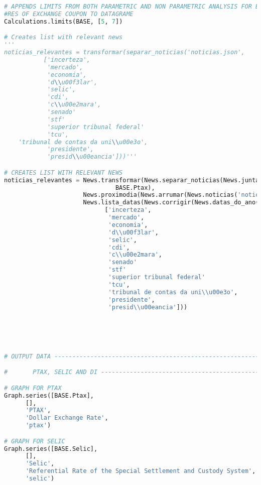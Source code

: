 \begin{lstlisting}[language=Python]
# APPENDS LIMITS FROM BOTH PARAMETRIC AND NON PARAMETRIC ANALYSIS FOR BOTH MEASU
#RES OF EXCHANGE COUPON TO DATAGRAME
Calculations.limits(BASE, [5, 7])

# Creates list with relevant news
'''
noticias_relevantes = transformar(separar_noticias('noticias.json',
           ['incerteza',
            'mercado',
            'economia',
            'd\\u00f3lar',
            'selic',
            'cdi',
            'c\\u00e2mara',
            'senado'
            'stf'
            'superior tribunal federal'
            'tcu',
    'tribunal de contas da uni\\u00e3o',
            'presidente',
            'presid\\u00eancia']))'''

# CREATES LIST WITH RELEVANT NEWS
noticias_relevantes = News.transformar(News.separar_noticias(News.juntar(News.corrigir(News.datas_do_ano(),
                               BASE.Ptax),
                      News.proximodia(News.arrumar(News.noticias('noticias.json')),
                      News.lista_datas(News.corrigir(News.datas_do_ano(), BASE.Ptax)))),
                            ['incerteza',
                             'mercado',
                             'economia',
                             'd\\u00f3lar',
                             'selic',
                             'cdi',
                             'c\\u00e2mara',
                             'senado'
                             'stf'
                             'superior tribunal federal'
                             'tcu',
                             'tribunal de contas da uni\\u00e3o',
                             'presidente',
                             'presid\\u00eancia']))





# OUTPUT DATA ------------------------------------------------------------------

#       PTAX, SELIC AND DI -----------------------------------------------------

# GRAPH FOR PTAX
Graph.series([BASE.Ptax],
      [],
      'PTAX',
      'Dollar Exchange Rate',
      'ptax')

# GRAPH FOR SELIC
Graph.series([BASE.Selic],
      [],
      'Selic',
      'Referential Rate of the Special Settlement and Custody System',
      'selic')


\end{lstlisting}
